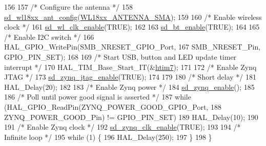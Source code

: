 \begin{DoxyCode}
156             
157     \textcolor{comment}{/* Configure the antenna */}
158     \mbox{\hyperlink{group___s_d___platform___w_l18xx___ant_ga3d09a16b4b68ce526bd3eddba77b655c}{sd\_wl18xx\_ant\_config}}(\mbox{\hyperlink{group___s_d___antenna___select_gad34710c5325cf565b89f2ce2f6fde3ae}{WL18xx\_ANTENNA\_SMA}});
159     
160     \textcolor{comment}{/* Enable wireless clock */}
161     \mbox{\hyperlink{group___s_d___platform___boot___config_ga5f6e21d454cec1f66957897103dafe85}{sd\_wl\_clk\_enable}}(TRUE);
162     
163     \mbox{\hyperlink{group___s_d___platform___boot___config_ga0f06bff92025356b589e3cfdae8ddcb7}{sd\_bt\_enable}}(TRUE);
164     
165     \textcolor{comment}{/* Enable I2C switch */}
166     HAL\_GPIO\_WritePin(SMB\_NRESET\_GPIO\_Port, 
167               SMB\_NRESET\_Pin, GPIO\_PIN\_SET);
168 
169     \textcolor{comment}{/* Start USB, button and LED update timer interrupt */}
170     HAL\_TIM\_Base\_Start\_IT(&\mbox{\hyperlink{group___s_d___t_i_m___exported___variables_gabb71bf3ee68e2a051fbeec6c3ab3012d}{htim7}});
171   
172         \textcolor{comment}{/* Enable Zynq JTAG */}
173     \mbox{\hyperlink{group___s_d___platform___boot___config_ga527ae13356897e13098f309174444556}{sd\_zynq\_jtag\_enable}}(TRUE);
174     
179     
180     \textcolor{comment}{/* Short delay */}
181     HAL\_Delay(20);      
182     
183     \textcolor{comment}{/* Enable Zynq power */}
184     \mbox{\hyperlink{group___s_d___platform___boot___config_gac30b9aa0032a9a8598735242c7cfa5bc}{sd\_zynq\_enable}}();
185     
186     \textcolor{comment}{/* Poll until power good signal is asserted */}
187     \textcolor{keywordflow}{while} (HAL\_GPIO\_ReadPin(ZYNQ\_POWER\_GOOD\_GPIO\_Port,
188                 ZYNQ\_POWER\_GOOD\_Pin) != GPIO\_PIN\_SET)
189         HAL\_Delay(10);
190 
191     \textcolor{comment}{/* Enable Zynq clock */}
192     \mbox{\hyperlink{group___s_d___platform___boot___config_gad7a6663ba74657a3939e7a9701db0454}{sd\_zynq\_clk\_enable}}(TRUE);
193 
194     \textcolor{comment}{/* Infinite loop */}
195     \textcolor{keywordflow}{while} (1) \{
196         HAL\_Delay(250);
197     \}
198 \}
\end{DoxyCode}
